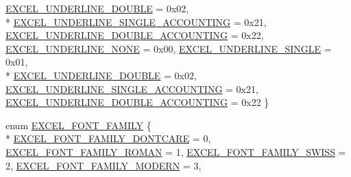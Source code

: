 \begin{DoxyCompactItemize}
\hyperlink{namespace_excel_format_a24c0e7797c103f21f016a661ee583267aa35a908773eb55b7ccb2a49ee5ffa16e}{E\+X\+C\+E\+L\+\_\+\+U\+N\+D\+E\+R\+L\+I\+N\+E\+\_\+\+D\+O\+U\+B\+L\+E} = 0x02, 
\\*
\hyperlink{namespace_excel_format_a24c0e7797c103f21f016a661ee583267afff01cd731b0f2bf2c912fd0a81b94cf}{E\+X\+C\+E\+L\+\_\+\+U\+N\+D\+E\+R\+L\+I\+N\+E\+\_\+\+S\+I\+N\+G\+L\+E\+\_\+\+A\+C\+C\+O\+U\+N\+T\+I\+N\+G} = 0x21, 
\hyperlink{namespace_excel_format_a24c0e7797c103f21f016a661ee583267aa8fd5f992f62a78173f580ee6903acc5}{E\+X\+C\+E\+L\+\_\+\+U\+N\+D\+E\+R\+L\+I\+N\+E\+\_\+\+D\+O\+U\+B\+L\+E\+\_\+\+A\+C\+C\+O\+U\+N\+T\+I\+N\+G} = 0x22, 
\hyperlink{namespace_excel_format_a24c0e7797c103f21f016a661ee583267a126cfb122221b71de89717a09ab87b34}{E\+X\+C\+E\+L\+\_\+\+U\+N\+D\+E\+R\+L\+I\+N\+E\+\_\+\+N\+O\+N\+E} = 0x00, 
\hyperlink{namespace_excel_format_a24c0e7797c103f21f016a661ee583267a331baf4c4baa50b52edffcee528974c6}{E\+X\+C\+E\+L\+\_\+\+U\+N\+D\+E\+R\+L\+I\+N\+E\+\_\+\+S\+I\+N\+G\+L\+E} = 0x01, 
\\*
\hyperlink{namespace_excel_format_a24c0e7797c103f21f016a661ee583267aa35a908773eb55b7ccb2a49ee5ffa16e}{E\+X\+C\+E\+L\+\_\+\+U\+N\+D\+E\+R\+L\+I\+N\+E\+\_\+\+D\+O\+U\+B\+L\+E} = 0x02, 
\hyperlink{namespace_excel_format_a24c0e7797c103f21f016a661ee583267afff01cd731b0f2bf2c912fd0a81b94cf}{E\+X\+C\+E\+L\+\_\+\+U\+N\+D\+E\+R\+L\+I\+N\+E\+\_\+\+S\+I\+N\+G\+L\+E\+\_\+\+A\+C\+C\+O\+U\+N\+T\+I\+N\+G} = 0x21, 
\hyperlink{namespace_excel_format_a24c0e7797c103f21f016a661ee583267aa8fd5f992f62a78173f580ee6903acc5}{E\+X\+C\+E\+L\+\_\+\+U\+N\+D\+E\+R\+L\+I\+N\+E\+\_\+\+D\+O\+U\+B\+L\+E\+\_\+\+A\+C\+C\+O\+U\+N\+T\+I\+N\+G} = 0x22
 \}
\item 
enum \hyperlink{namespace_excel_format_a4f47c1508e4d09e1e52265feed4bedff}{E\+X\+C\+E\+L\+\_\+\+F\+O\+N\+T\+\_\+\+F\+A\+M\+I\+L\+Y} \{ \\*
\hyperlink{namespace_excel_format_a4f47c1508e4d09e1e52265feed4bedffaa3b2a84415ff3addee1bb0379d1825c2}{E\+X\+C\+E\+L\+\_\+\+F\+O\+N\+T\+\_\+\+F\+A\+M\+I\+L\+Y\+\_\+\+D\+O\+N\+T\+C\+A\+R\+E} = 0, 
\hyperlink{namespace_excel_format_a4f47c1508e4d09e1e52265feed4bedffaa314068e9f59c88bc6a3097231e53425}{E\+X\+C\+E\+L\+\_\+\+F\+O\+N\+T\+\_\+\+F\+A\+M\+I\+L\+Y\+\_\+\+R\+O\+M\+A\+N} = 1, 
\hyperlink{namespace_excel_format_a4f47c1508e4d09e1e52265feed4bedffa1260c7ea55749f1f8f64472318944bab}{E\+X\+C\+E\+L\+\_\+\+F\+O\+N\+T\+\_\+\+F\+A\+M\+I\+L\+Y\+\_\+\+S\+W\+I\+S\+S} = 2, 
\hyperlink{namespace_excel_format_a4f47c1508e4d09e1e52265feed4bedffa6138e3673e0ada2f804cd4ebe800372f}{E\+X\+C\+E\+L\+\_\+\+F\+O\+N\+T\+\_\+\+F\+A\+M\+I\+L\+Y\+\_\+\+M\+O\+D\+E\+R\+N} = 3, 

\end{DoxyCompactItemize}
